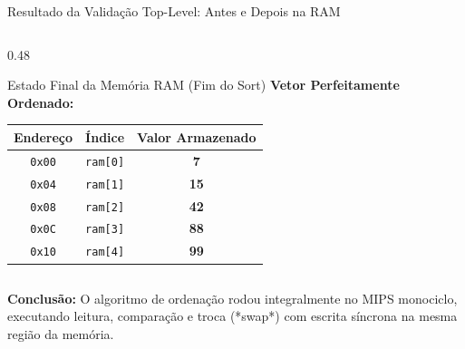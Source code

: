 \documentclass[aspectratio=169, 11pt]{beamer}
\begin{document}
\begin{frame}{Resultado da Validação Top-Level: Antes e Depois na RAM}
\begin{columns}[T]
    \begin{column}{0.48\textwidth}
      \begin{exampleblock}{Estado Final da Memória RAM (Fim do Sort)}
        \centering
        \textbf{Vetor Perfeitamente Ordenado:} \\
        \vspace{0.2cm}
        \small
        \begin{tabular}{ccc}
          \toprule
          \textbf{Endereço} & \textbf{Índice} & \textbf{Valor Armazenado} \\
          \midrule
          \texttt{0x00} & \texttt{ram[0]} & \textcolor{passgreen}{\textbf{7}} \\
          \texttt{0x04} & \texttt{ram[1]} & \textcolor{passgreen}{\textbf{15}} \\
          \texttt{0x08} & \texttt{ram[2]} & \textcolor{passgreen}{\textbf{42}} \\
          \texttt{0x0C} & \texttt{ram[3]} & \textcolor{passgreen}{\textbf{88}} \\
          \texttt{0x10} & \texttt{ram[4]} & \textcolor{passgreen}{\textbf{99}} \\
          \bottomrule
        \end{tabular}
      \end{exampleblock}
    \end{column}
  \end{columns}

  \vspace{0.3cm}
  \centering
  \textbf{Conclusão:} O algoritmo de ordenação rodou integralmente no MIPS monociclo, executando leitura, comparação e troca (*swap*) com escrita síncrona na mesma região da memória.
\end{frame}
\end{document}
